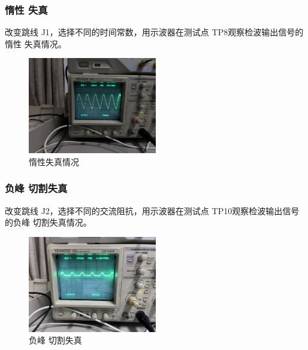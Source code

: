 \documentclass{../source/Experiment}
\begin{document}
\subsubsection{惰性
失真}
改变跳线 J1，选择不同的时间常数，用示波器在测试点 TP8观察检波输出信号的惰性
失真情况。
\begin{figure}[H]
    \centering
    \includegraphics[width = 0.5\textwidth]{lab6/6.jpg}
    \caption{惰性失真情况}
\end{figure}

\subsubsection{负峰
切割失真}
改变跳线 J2，选择不同的交流阻抗，用示波器在测试点 TP10观察检波输出信号的负峰
切割失真情况。
\begin{figure}[H]
    \centering
    \includegraphics[width = 0.5\textwidth]{lab6/7.jpg}
    \caption{负峰
    切割失真}
\end{figure}
\end{document}
